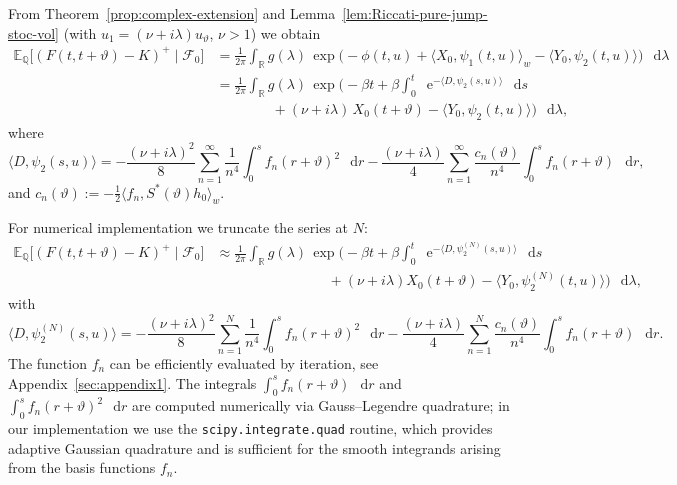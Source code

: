 \documentclass[10pt,a4paper,reqno]{amsart}
\newcommand*\D{\mathop{}\!\mathrm{d}}
\newcommand*\E{\mathop{}\!\mathrm{e}}
\numberwithin{equation}{section}
\theoremstyle{plain}
\theoremstyle{definition}
\theoremstyle{example}
\renewcommand{\MR}{\mathbb{R}}
\newcommand{\MQ}{\mathbb{Q}}
\newcommand{\R}{\MR}
\newcommand{\cF}{\mathcal{F}}
\begin{document}
From Theorem~\ref{prop:complex-extension} and Lemma~\ref{lem:Riccati-pure-jump-stoc-vol} (with $u_1=(\nu+i\lambda)u_\vartheta$, $\nu>1$) we obtain
\begin{equation}
\label{eq:option_b0}
\begin{aligned}
\mathbb{E}_{\MQ}\big[(F(t,t+\vartheta)-K)^+\mid \cF_0\big]
&= \frac{1}{2\pi}\int_{\R} g(\lambda)\,
   \exp\Big(
      -\phi(t,u) + \langle X_0,\psi_1(t,u)\rangle_w - \langle Y_0,\psi_2(t,u)\rangle
   \Big)\,\D\lambda \\
&= \frac{1}{2\pi}\int_{\R} g(\lambda)\,
   \exp\Big(
     -\beta t +  \beta \int_0^t \E^{-\langle D,\psi_2(s,u)\rangle}\,\D s
       \\
&\qquad\qquad
      +(\nu+i\lambda)\,X_0(t+\vartheta)- \langle Y_0,\psi_2(t,u)\rangle
   \Big)\,\D\lambda,
\end{aligned}
\end{equation}
where
$$
\langle D,\psi_2(s,u)\rangle
= -\frac{(\nu+i\lambda)^2}{8}\sum_{n=1}^{\infty}\frac{1}{n^4}\int_0^s f_n(r+\vartheta)^2\,\D r
  -\frac{(\nu+i\lambda)}{4}\sum_{n=1}^{\infty}\frac{c_n(\vartheta)}{n^4}\int_0^s f_n(r+\vartheta)\,\D r,
$$
and $c_n(\vartheta):=-\tfrac12\langle f_n,S^*(\vartheta)h_0\rangle_w$.

For numerical implementation we truncate the series at $N$:
\begin{equation}
\label{eq:option_b0_trunc}
\begin{aligned}
\mathbb{E}_{\MQ}\!\big[(F(t,t+\vartheta)-K)^+\mid \cF_0\big]
&\approx \frac{1}{2\pi}\int_{\R} g(\lambda)\,
   \exp\Big(
     -\beta t + \beta \int_0^t \E^{-\langle D,\psi_2^{(N)}(s,u)\rangle}\,\D s \\
&\qquad\qquad\qquad\qquad
      + (\nu+i\lambda)X_0(t+\vartheta)
      - \langle Y_0,\psi_2^{(N)}(t,u)\rangle
   \Big)\,\D\lambda,
\end{aligned}
\end{equation}
with 
$$
\langle D,\psi_2^{(N)}(s,u)\rangle
= -\frac{(\nu+i\lambda)^2}{8}\sum_{n=1}^{N}\frac{1}{n^4}\int_0^s f_n(r+\vartheta)^2\,\D r
  -\frac{(\nu+i\lambda)}{4}\sum_{n=1}^{N}\frac{c_n(\vartheta)}{n^4}\int_0^s f_n(r+\vartheta)\,\D r.
$$
The function $f_n$ can be efficiently evaluated by iteration, see Appendix~\ref{sec:appendix1}. The integrals $\int_0^s f_n(r+\vartheta)\,\D r$ and $\int_0^s f_n(r+\vartheta)^2\,\D r$ are computed numerically via Gauss--Legendre quadrature; in our implementation we use the \texttt{scipy.integrate.quad} routine, which provides adaptive Gaussian quadrature and is sufficient for the smooth integrands arising from the basis functions $f_n$.
\end{document}

